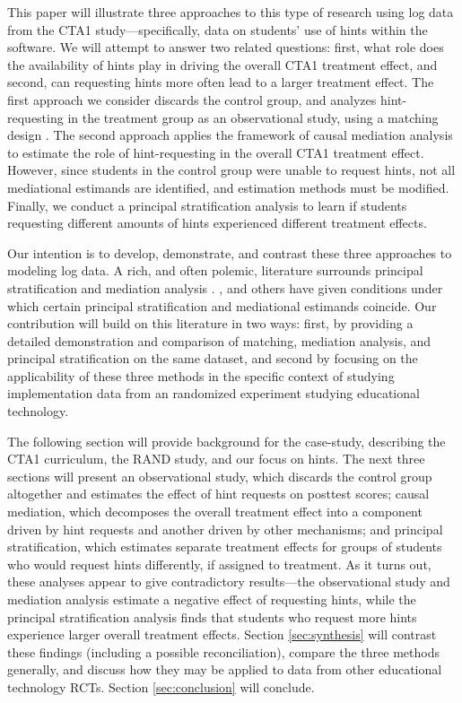 \documentclass{article}\usepackage[]{graphicx}\usepackage[]{color}
\begin{document}
This paper will illustrate three approaches to this type of research
using log data from the CTA1 study---specifically, data on students' use
of hints within the software.
We will attempt to answer two related questions: first, what role does
the availability of hints play in driving the overall CTA1 treatment
effect, and second, can requesting hints more often lead to a larger
treatment effect.
The first approach we consider discards the control group, and analyzes
hint-requesting in the treatment group as an observational study,
using a matching design
\citep[c.f.][]{rosenbaum2002observational}. The
second approach applies the framework of causal mediation analysis
\citep{vanderweele2015explanation,hong2015causality,imai2011unpacking} to estimate the role of
hint-requesting in the overall CTA1 treatment effect. However, since
students in the control group were unable to request hints, not all
mediational estimands are identified, and estimation methods must be
modified.
Finally, we conduct a principal stratification analysis
\citep{frangakis} to learn if students requesting different amounts of
hints experienced different treatment effects.

Our intention is to develop, demonstrate, and contrast these three
approaches to modeling log data.
A rich, and often polemic, literature surrounds principal
stratification and mediation analysis
\citep[e.g.][]{rubin2004direct,vanderweele2011principal,pearl2011principal,mealli2012refreshing,vanderweele2012comments}.
\citet{vanderweele2008simple}, \citet{jo2008causal} and others have
given conditions under which certain principal stratification and mediational
estimands coincide.
Our contribution will build on this literature in two ways: first, by
providing a detailed demonstration and comparison of matching, mediation analysis,
and principal stratification on the same dataset, and second by
focusing on the applicability of these three methods in the specific
context of studying implementation data from an randomized
experiment studying educational technology.

The following section will provide background for the case-study,
describing the CTA1 curriculum, the RAND study, and our focus on
hints.
The next three sections will present an observational study,
which discards the control group altogether and estimates the effect
of hint requests on posttest scores;
causal mediation, which decomposes the overall treatment effect into a
component driven by hint requests and another driven by other
mechanisms; and principal stratification, which estimates separate
treatment effects for groups of students who would request hints
differently, if assigned to treatment.
As it turns out, these analyses appear to give contradictory
results---the observational study and mediation analysis estimate a
negative effect of requesting hints, while the principal
stratification analysis finds that students who request more hints
experience larger overall treatment effects.
Section \ref{sec:synthesis} will contrast these findings (including a
possible reconciliation), compare the three methods generally,
and discuss how they may be applied to data from other educational
technology RCTs.
Section \ref{sec:conclusion} will conclude.
\end{document}

